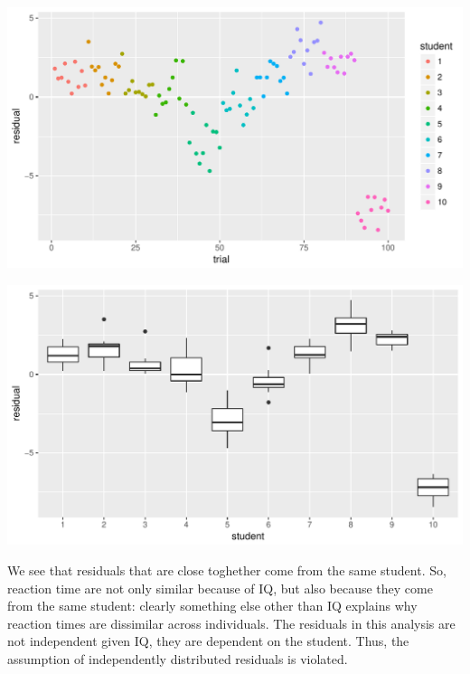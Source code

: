 \documentclass[]{report}\usepackage[]{graphicx}\usepackage[]{color}
\makeatletter
\def\maxwidth{ %
  \ifdim\Gin@nat@width>\linewidth
    \linewidth
  \else
    \Gin@nat@width
  \fi
}
\newenvironment{knitrout}{}{} %
\makeatother
\begin{document}
\begin{knitrout}
\color{fgcolor}

{\centering \includegraphics[width=\maxwidth]{figure/fig1415-1} 

}




{\centering \includegraphics[width=\maxwidth]{figure/fig1415-2} 

}



\end{knitrout}

We see that residuals that are close toghether come from the same student. So, reaction time are not only similar because of IQ, but also because they come from the same student: clearly something else other than IQ explains why reaction times are dissimilar across individuals. The residuals in this analysis are not independent given IQ, they are dependent on the student. Thus, the assumption of independently distributed residuals is violated. 
\end{document}
